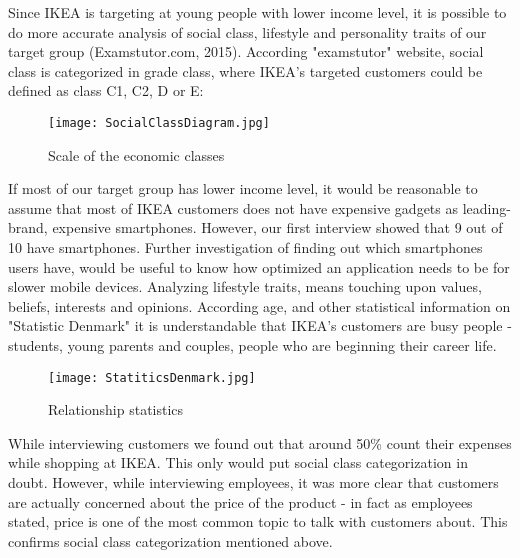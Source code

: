 Since IKEA is targeting at young people with lower income level, it is possible to do more accurate analysis of social class, lifestyle and personality traits of our target group (Examstutor.com,  2015). According "examstutor" website, social class is categorized in grade class, where IKEA’s targeted customers could be defined as class C1, C2, D or E:
\begin{figure}[H]
\centering
\texttt{[image: SocialClassDiagram.jpg]}
\caption{Scale of the economic classes}
\end{figure}
If most of our target group has lower income level, it would be reasonable to assume that most of IKEA customers does not have expensive gadgets as leading-brand, expensive smartphones. However, our first interview showed that 9 out of 10 have smartphones. Further investigation of finding out which smartphones users have, would be useful to know how optimized an application needs to be for slower mobile devices. 
Analyzing lifestyle traits, means touching upon values, beliefs, interests and opinions. According age, and other statistical information on "Statistic Denmark" it is understandable that IKEA’s customers are busy people - students, young parents and couples, people who are beginning their career life. 
\begin{figure}[H]
\centering
\texttt{[image: StatiticsDenmark.jpg]}
\caption{Relationship statistics}
\end{figure}
While interviewing customers we found out that around 50\% count their expenses  while shopping at IKEA. This only would put social class categorization in doubt. However, while interviewing employees, it was more clear that customers are actually concerned about the price of the product - in fact as employees stated, price is one of the most common topic to talk with customers about. This confirms social class categorization mentioned above. 
